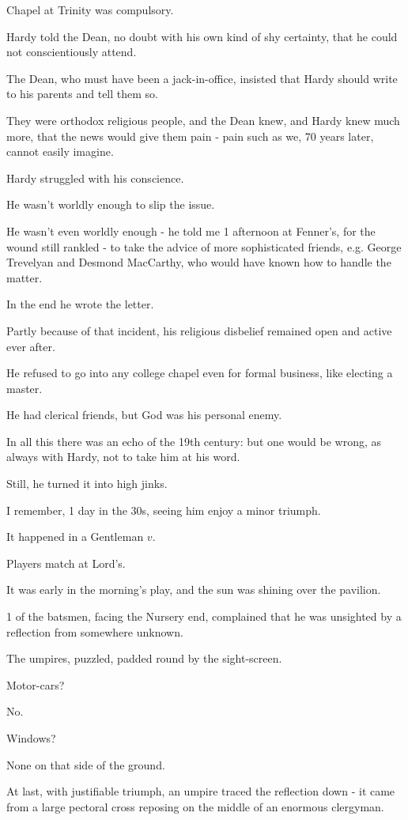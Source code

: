 \documentclass{article}
\numberwithin{equation}{section}
\begin{document}
Chapel at Trinity was compulsory.

Hardy told the Dean, no doubt with his own kind of shy certainty, that he could not conscientiously attend.

The Dean, who must have been a jack-in-office, insisted that Hardy should write to his parents and tell them so.

They were orthodox religious people, and the Dean knew, and Hardy knew much more, that the news would give them pain - pain such as we, 70 years later, cannot easily imagine.

%
Hardy struggled with his conscience.

He wasn't worldly enough to slip the issue.

He wasn't even worldly enough - he told me 1 afternoon at Fenner's, for the wound still rankled - to take the advice of more sophisticated friends, e.g. George Trevelyan and Desmond MacCarthy, who would have known how to handle the matter.

In the end he wrote the letter.

Partly because of that incident, his religious disbelief remained open and active ever after.

He refused to go into any college chapel even for formal business, like electing a master.

He had clerical friends, but God was his personal enemy.

In all this there was an echo of the 19th century: but one would be wrong, as always with Hardy, not to take him at his word.

%
Still, he turned it into high jinks.

I remember, 1 day in the 30s, seeing him enjoy a minor triumph.

It happened in a Gentleman $v$.

Players match at Lord's.

It was early in the morning's play, and the sun was shining over the pavilion.

1 of the batsmen, facing the Nursery end, complained that he was unsighted by a reflection from somewhere unknown.

The umpires, puzzled, padded round by the sight-screen.

Motor-cars?

No.

Windows?

None on that side of the ground.

At last, with justifiable triumph, an umpire traced the reflection down - it came from a large pectoral cross reposing on the middle of an enormous clergyman.
\end{document}
